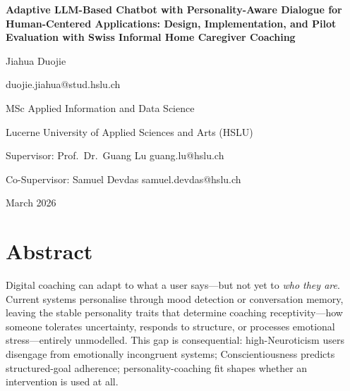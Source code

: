 \documentclass[10pt,a4paper]{report}
\begin{document}
\begin{titlepage}
\centering
\vspace*{2cm}
{\LARGE\bfseries Adaptive LLM-Based Chatbot with Personality-Aware Dialogue for Human-Centered Applications: Design, Implementation, and Pilot Evaluation with Swiss Informal Home Caregiver Coaching\par}
\vspace{2cm}
{\Large Jiahua Duojie\par}
\vspace{0.5cm}
{\normalsize duojie.jiahua@stud.hslu.ch\par}
\vspace{1.5cm}
{\large MSc Applied Information and Data Science\par}
{\large Lucerne University of Applied Sciences and Arts (HSLU)\par}
\vspace{0.5cm}
\vspace{1.5cm}
{\normalsize Supervisor: Prof.\ Dr.\ Guang Lu \quad guang.lu@hslu.ch\par}
{\normalsize Co-Supervisor: Samuel Devdas \quad samuel.devdas@hslu.ch\par}
\vfill
{\large March 2026\par}
\end{titlepage}

\chapter*{Abstract}

Digital coaching can adapt to what a user says---but not yet to \emph{who they are}. Current systems personalise through mood detection or conversation memory, leaving the stable personality traits that determine coaching receptivity---how someone tolerates uncertainty, responds to structure, or processes emotional stress---entirely unmodelled. This gap is consequential: high-Neuroticism users disengage from emotionally incongruent systems; Conscientiousness predicts structured-goal adherence; personality-coaching fit shapes whether an intervention is used at all.
\end{document}
